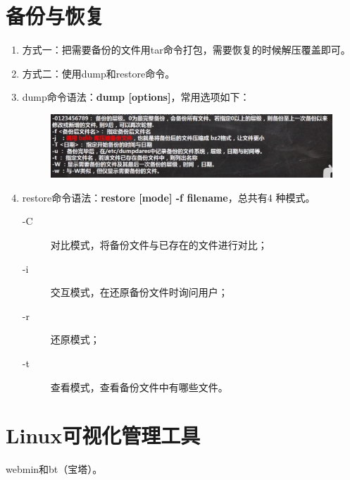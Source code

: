 \documentclass[11pt]{article}
\begin{document}
\section{备份与恢复}
\begin{enumerate}
    \item 方式一：把需要备份的文件用tar命令打包，需要恢复的时候解压覆盖即可。
    \item 方式二：使用dump和restore命令。
    \item dump命令语法：\textbf{dump [options]}，常用选项如下：
    \begin{figure}[htb]
        \centering
        \includegraphics[scale=0.2]{imgs/dump_opt.png}
    \end{figure}
    \item restore命令语法：\textbf{restore [mode] -f filename}，总共有4
    种模式。
    \begin{description}
        \item[-C] 对比模式，将备份文件与已存在的文件进行对比；
        \item[-i] 交互模式，在还原备份文件时询问用户；
        \item[-r] 还原模式；
        \item[-t] 查看模式，查看备份文件中有哪些文件。
    \end{description}
\end{enumerate}

\section{Linux可视化管理工具}
webmin和bt（宝塔）。















    
\end{document}
